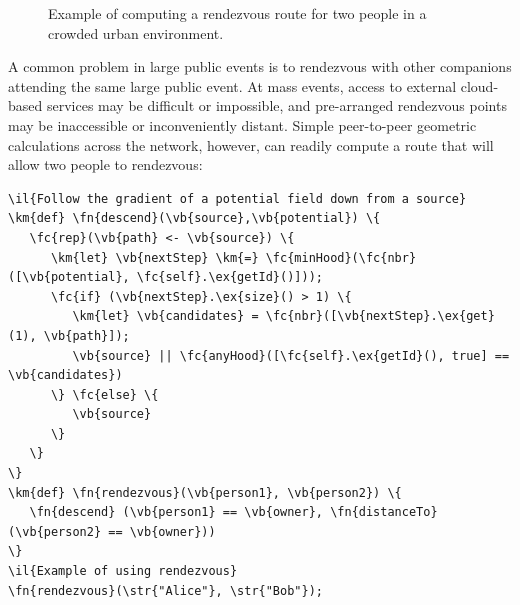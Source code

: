 \documentclass[12pt,a4paper,twoside,openright]{book}
\begin{document}
\begin{figure}
{\label{img:protelis-rendezvous-middle2}}
%
% 
\caption{Example of computing a rendezvous route for two people in a crowded urban
environment.}
\label{img:protelis-rendezvous}
\end{figure}

A common problem in large public events is to rendezvous with other companions
attending the same large public event. At mass events, access to external
cloud-based services may be difficult or impossible, and pre-arranged rendezvous
points may be inaccessible or inconveniently distant.
Simple peer-to-peer geometric calculations across the network, however, can
readily compute a route that will allow two people to rendezvous:
\begin{Verbatim}[samepage=true, frame=single, commandchars=\\\{\}]
\il{Follow the gradient of a potential field down from a source}
\km{def} \fn{descend}(\vb{source},\vb{potential}) \{
   \fc{rep}(\vb{path} <- \vb{source}) \{
      \km{let} \vb{nextStep} \km{=} \fc{minHood}(\fc{nbr}([\vb{potential}, \fc{self}.\ex{getId}()]));
      \fc{if} (\vb{nextStep}.\ex{size}() > 1) \{
         \km{let} \vb{candidates} = \fc{nbr}([\vb{nextStep}.\ex{get}(1), \vb{path}]);
         \vb{source} || \fc{anyHood}([\fc{self}.\ex{getId}(), true] == \vb{candidates})
      \} \fc{else} \{
         \vb{source}
      \}
   \}
\}
\km{def} \fn{rendezvous}(\vb{person1}, \vb{person2}) \{
   \fn{descend} (\vb{person1} == \vb{owner}, \fn{distanceTo}(\vb{person2} == \vb{owner}))
\}
\il{Example of using rendezvous}
\fn{rendezvous}(\str{"Alice"}, \str{"Bob"});
\end{Verbatim}
\end{document}
